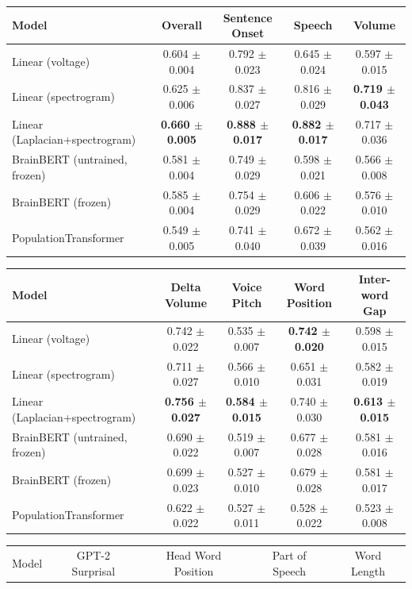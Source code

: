 \begin{table}[h]
\centering
\begin{tabular}{lcccc}
\hline
Model & Overall & Sentence Onset & Speech & Volume \\
\hline
Linear (voltage) & 0.604 $\pm$ 0.004 & 0.792 $\pm$ 0.023 & 0.645 $\pm$ 0.024 & 0.597 $\pm$ 0.015 \\
Linear (spectrogram) & 0.625 $\pm$ 0.006 & 0.837 $\pm$ 0.027 & 0.816 $\pm$ 0.029 & \textbf{0.719 $\pm$ 0.043} \\
Linear (Laplacian+spectrogram) & \textbf{0.660 $\pm$ 0.005} & \textbf{0.888 $\pm$ 0.017} & \textbf{0.882 $\pm$ 0.017} & 0.717 $\pm$ 0.036 \\
BrainBERT (untrained, frozen) & 0.581 $\pm$ 0.004 & 0.749 $\pm$ 0.029 & 0.598 $\pm$ 0.021 & 0.566 $\pm$ 0.008 \\
BrainBERT (frozen) & 0.585 $\pm$ 0.004 & 0.754 $\pm$ 0.029 & 0.606 $\pm$ 0.022 & 0.576 $\pm$ 0.010 \\
PopulationTransformer & 0.549 $\pm$ 0.005 & 0.741 $\pm$ 0.040 & 0.672 $\pm$ 0.039 & 0.562 $\pm$ 0.016 \\
\hline
\end{tabular}
\hspace{1em}
\begin{tabular}{lcccc}
\hline
Model & Delta Volume & Voice Pitch & Word Position & Inter-word Gap \\
\hline
Linear (voltage) & 0.742 $\pm$ 0.022 & 0.535 $\pm$ 0.007 & \textbf{0.742 $\pm$ 0.020} & 0.598 $\pm$ 0.015 \\
Linear (spectrogram) & 0.711 $\pm$ 0.027 & 0.566 $\pm$ 0.010 & 0.651 $\pm$ 0.031 & 0.582 $\pm$ 0.019 \\
Linear (Laplacian+spectrogram) & \textbf{0.756 $\pm$ 0.027} & \textbf{0.584 $\pm$ 0.015} & 0.740 $\pm$ 0.030 & \textbf{0.613 $\pm$ 0.015} \\
BrainBERT (untrained, frozen) & 0.690 $\pm$ 0.022 & 0.519 $\pm$ 0.007 & 0.677 $\pm$ 0.028 & 0.581 $\pm$ 0.016 \\
BrainBERT (frozen) & 0.699 $\pm$ 0.023 & 0.527 $\pm$ 0.010 & 0.679 $\pm$ 0.028 & 0.581 $\pm$ 0.017 \\
PopulationTransformer & 0.622 $\pm$ 0.022 & 0.527 $\pm$ 0.011 & 0.528 $\pm$ 0.022 & 0.523 $\pm$ 0.008 \\
\hline
\end{tabular}
\hspace{1em}
\begin{tabular}{lcccc}
\hline
Model & GPT-2 Surprisal & Head Word Position & Part of Speech & Word Length \\

\end{tabular}
\end{table}
